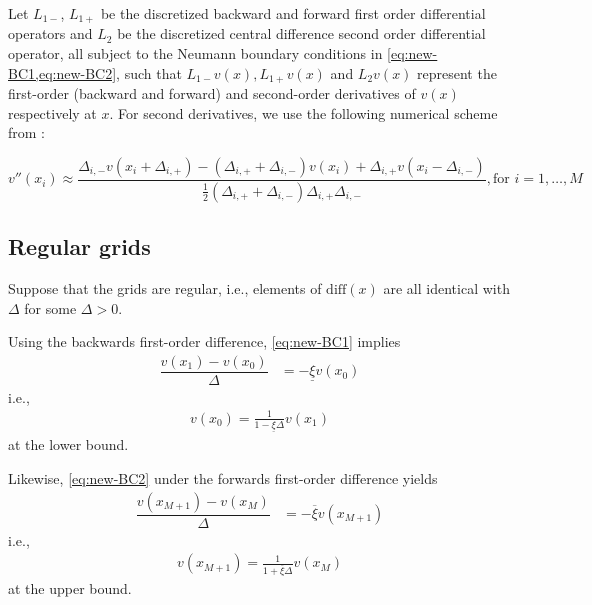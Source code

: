 \documentclass[11pt]{article}
\theoremstyle{definition}
\begin{document}
Let $L_{1-}$, $L_{1+}$ be the discretized backward and forward first order differential operators and $L_2$ be the discretized central difference  second order differential operator, all subject to the Neumann boundary conditions in \cref{eq:new-BC1,eq:new-BC2}, such that $L_{1-} v(x), L_{1+} v(x)$ and $L_2 v(x)$ represent the first-order (backward and forward) and second-order derivatives of $v(x)$ respectively at $x$. For second derivatives, we use the following numerical scheme from \cite{achdou17}:

\begin{equation}
v''(x_i) \approx \dfrac{ \Delta_{i,-} v( x_i + \Delta_{i,+}) - (\Delta_{i,+} + \Delta_{i,-}) v( x_i ) + \Delta_{i,+} v( x_i - \Delta_{i,-})}{\frac{1}{2}(\Delta_{i,+} + \Delta_{i,-}) \Delta_{i,+} \Delta_{i,-} }, \text{for } i = 1, \ldots, M
\end{equation}





\subsection{Regular grids}
Suppose that the grids are regular, i.e., elements of $\text{diff}(x)$ are all identical with $\Delta$ for some $\Delta > 0$.

Using the backwards first-order difference, \eqref{eq:new-BC1} implies
\begin{align}
\dfrac{v({x_{1}}) - v(x_{0})}{\Delta} &= - \underline{\xi} v({x_{0}})
\end{align}
i.e.,
\begin{align}\label{eq:BC1-extrapolation-uniform}
v(x_0) = \frac{1}{1-\underline{\xi} \Delta } v(x_1)
\end{align}
at the lower bound.

Likewise, \eqref{eq:new-BC2} under the forwards first-order difference yields
\begin{align}
\dfrac{v(x_{M+1}) - v({x_{M}})}{\Delta} &= - \overline{\xi} v({x_{M+1} })
\end{align}
i.e.,
\begin{align}\label{eq:BC2-extrapolation-uniform}
v(x_{M+1}) = \frac{1}{1+\overline{\xi} \Delta } v(x_M)
\end{align}
at the upper bound.
\end{document}
